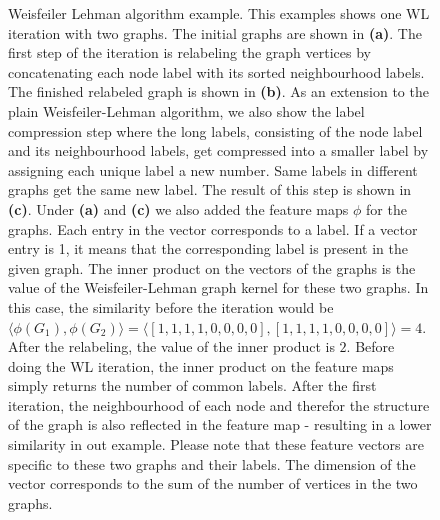\begin{figure}[ht]
  \hfill
  \hfill
  \caption{Weisfeiler Lehman algorithm example. This examples shows one WL iteration with two graphs. The initial graphs are shown in \textbf{(a)}. The first step of the iteration is relabeling the graph vertices by concatenating each node label with its sorted neighbourhood labels. The finished relabeled graph is shown in \textbf{(b)}. As an extension to the plain Weisfeiler-Lehman algorithm, we also show the label compression step where the long labels, consisting of the node label and its neighbourhood labels, get compressed into a smaller label by assigning each unique label a new number. Same labels in different graphs get the same new label. The result of this step is shown in \textbf{(c)}. Under \textbf{(a)} and \textbf{(c)} we also added the feature maps $\phi{}$ for the graphs. Each entry in the vector corresponds to a label. If a vector entry is 1, it means that the corresponding label is present in the given graph. The inner product on the vectors of the graphs is the value of the Weisfeiler-Lehman graph kernel for these two graphs.
  In this case, the similarity before the iteration would be $\langle \phi(G_1), \phi(G_2) \rangle = \langle [1, 1, 1, 1, 0, 0, 0, 0], [1, 1, 1, 1, 0, 0, 0, 0] \rangle = 4$. After the relabeling, the value of the inner product is $2$.
  Before doing the WL iteration, the inner product on the feature maps simply returns the number of common labels. After the first iteration, the neighbourhood of each node and therefor the structure of the graph is also reflected in the feature map - resulting in a lower similarity in out example.
  Please note that these feature vectors are specific to these two graphs and their labels. The dimension of the vector corresponds to the sum of the number of vertices in the two graphs.}\label{fig:wl_example}
\end{figure}

